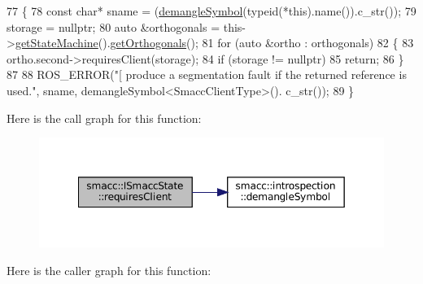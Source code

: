 \begin{DoxyCode}
77 \{
78     \textcolor{keyword}{const} \textcolor{keywordtype}{char}* sname = (\hyperlink{namespacesmacc_1_1introspection_a2f495108db3e57604d8d3ff5ef030302}{demangleSymbol}(\textcolor{keyword}{typeid}(*this).name()).c\_str());
79     storage = \textcolor{keyword}{nullptr};
80     \textcolor{keyword}{auto} &orthogonals = this->\hyperlink{classsmacc_1_1ISmaccState_a562bb3f9a3ac16b8be71e4794c9e7523}{getStateMachine}().\hyperlink{classsmacc_1_1ISmaccStateMachine_a7f5b2882dbd077584767cb2533ed3c49}{getOrthogonals}();
81     \textcolor{keywordflow}{for} (\textcolor{keyword}{auto} &ortho : orthogonals)
82     \{
83         ortho.second->requiresClient(storage);
84         \textcolor{keywordflow}{if} (storage != \textcolor{keyword}{nullptr})
85             \textcolor{keywordflow}{return};
86     \}
87 
88     ROS\_ERROR(\textcolor{stringliteral}{"[%
       produce a segmentation fault if the returned reference is used."}, sname, demangleSymbol<SmaccClientType>().
      c\_str());
89 \}
\end{DoxyCode}
Here is the call graph for this function\+:
\nopagebreak
\begin{figure}[H]
\begin{center}
\leavevmode
\includegraphics[width=349pt]{classsmacc_1_1ISmaccState_a7f95c9f0a6ea2d6f18d1aec0519de4ac_cgraph}
\end{center}
\end{figure}
Here is the caller graph for this function\+:
\nopagebreak
